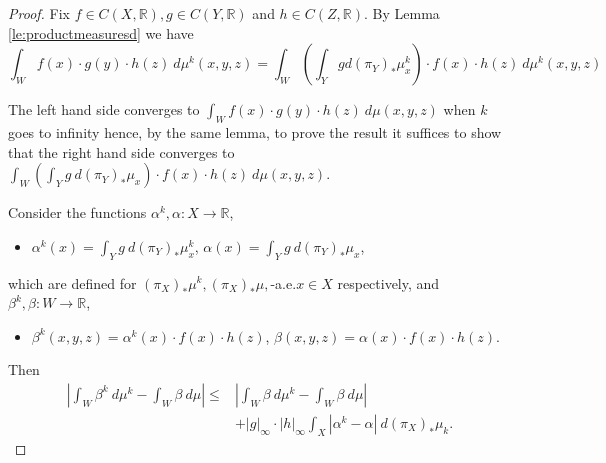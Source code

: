 \documentclass[11pt,letterpaper,reqno]{article}
\newcommand{\R}{\mathbb{R}}
\begin{document}
\begin{proof}
Fix $f\in C(X,\R), g \in C(Y,\R)$ and $h\in C(Z,\R)$. By Lemma \ref{le:productmeasuresd} we have
\[
	\int_W f(x)\cdot g(y)\cdot h(z)\ d\mu^k(x,y,z)=\int_W \left(\int_Y g d(\pi_{Y})_*\mu_x^k \right)\cdot f(x) \cdot h(z) \ d\mu^k(x,y,z)
\]

 The left hand side converges to \( \int_W f(x)\cdot g(y)\cdot h(z)\ d\mu(x,y,z)\) when $k$ goes to infinity hence, by the same lemma, to prove the result it suffices to show that the right hand side converges to \(\int_W \left( \int_Y g \ d(\pi_{Y})_*\mu_x\right)\cdot f(x)\cdot h(z)\ d\mu(x,y,z)\).


Consider the functions $\alpha^k, \alpha: X \rightarrow \R$,  
\begin{itemize}
	\item $\alpha^k(x)=\int_Y g \ d(\pi_{Y})_* \mu_x^k$, $\alpha(x)=\int_Y g \ d(\pi_{Y})_* \mu_x$,
\end{itemize}
which are defined for $(\pi_{X})_* \mu^k, (\pi_{X})_* \mu, $-a.e.\@ $x\in X$ respectively, and $\beta^k, \beta: W \to  \R$,
\begin{itemize}
	\item $\beta^k(x,y,z)=\alpha^k(x)\cdot f(x) \cdot h(z)$, $\beta(x,y,z)=\alpha(x)\cdot f(x) \cdot h(z)$. 
\end{itemize}
Then
\begin{align*}
\left|\int_W \beta^k\ d\mu^k-\int_W \beta\ d\mu\right|\leq &\left|\int_W \beta\ d\mu^k-\int_W \beta\ d\mu\right|\\
&+|g|_{\infty}\cdot|h|_{\infty}\int_X |\alpha^k-\alpha|\ d (\pi_X)_* \mu_k.
\end{align*}


\end{proof}
\end{document}
